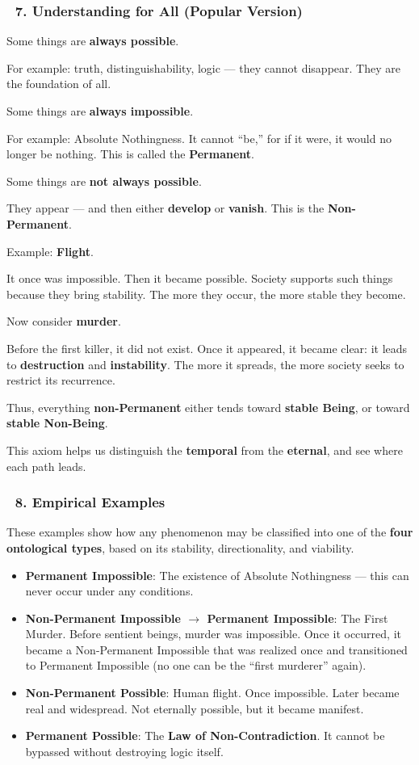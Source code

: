 \documentclass[12pt]{article}
\begin{document}
\subsubsection*{🔹 7. Understanding for All (Popular Version)}
Some things are \textbf{always possible}.

For example: truth, distinguishability, logic — they cannot disappear. They are the foundation of all.

Some things are \textbf{always impossible}.

For example: Absolute Nothingness. It cannot ``be,'' for if it were, it would no longer be nothing. This is called the \textbf{Permanent}.

Some things are \textbf{not always possible}.

They appear — and then either \textbf{develop} or \textbf{vanish}. This is the \textbf{Non-Permanent}.

Example: \textbf{Flight}.

It once was impossible. Then it became possible. Society supports such things because they bring stability. The more they occur, the more stable they become.

Now consider \textbf{murder}.

Before the first killer, it did not exist. Once it appeared, it became clear: it leads to \textbf{destruction} and \textbf{instability}. The more it spreads, the more society seeks to restrict its recurrence.

Thus, everything \textbf{non-Permanent} either tends toward \textbf{stable Being}, or toward \textbf{stable Non-Being}.

This axiom helps us distinguish the \textbf{temporal} from the \textbf{eternal}, and see where each path leads.

\subsubsection*{🔹 8. Empirical Examples}
These examples show how any phenomenon may be classified into one of the \textbf{four ontological types}, based on its stability, directionality, and viability.

\begin{itemize}
\item \textbf{Permanent Impossible}: The existence of Absolute Nothingness — this can never occur under any conditions.
\item \textbf{Non-Permanent Impossible $\rightarrow$ Permanent Impossible}: The First Murder. Before sentient beings, murder was impossible. Once it occurred, it became a Non-Permanent Impossible that was realized once and transitioned to Permanent Impossible (no one can be the ``first murderer'' again).
\item \textbf{Non-Permanent Possible}: Human flight. Once impossible. Later became real and widespread. Not eternally possible, but it became manifest.
\item \textbf{Permanent Possible}: The \textbf{Law of Non-Contradiction}. It cannot be bypassed without destroying logic itself.
\end{itemize}
\end{document}
